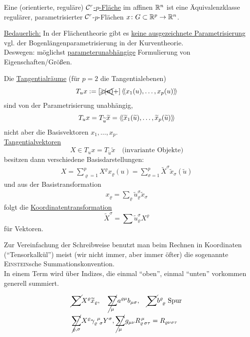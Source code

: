 \begin{definition}
Eine (orientierte, reguläre) \uline{\(\mathcal{C}^r\)-\(p\)-Fläche} im affinen \( \mathbb{R}^n\) ist eine Äquivalenzklasse regulärer, parametrisierter \(\mathcal{C}^r\)-\(p\)-Flächen \(x \colon G \subset \mathbb{R}^p \rightarrow \mathbb{R}^n\).
\end{definition}

\uline{Bedauerlich:}
In der Flächentheorie gibt es \uline{keine ausgezeichnete Parametrisierung} vgl. der Bogenlängenparametrisierung in der Kurventheorie. \\
Deswegen: möglichst \uline{parameterunabhängige} Formulierung von Eigenschaften/Größen. 

\begin{bsp}
 Die \uline{Tangentialräume} (für \(p = 2\) die Tangentialebenen)
 \[
  T_u x := \left[\xcancel{x(u)} + \right] \left\langle\!\left\langle x_1(u) , \dots, x_p(u) \right\rangle\!\right\rangle
 \]
 sind von der Parametrisierung unabhängig,
 \[
  T_u x = T_{\widetilde u}\widetilde x = \left\langle\!\left\langle \widetilde x_1( \widetilde u) , \dots, \widetilde x_p ( \widetilde u) \right\rangle\!\right\rangle
 \]
 nicht aber die Basisvektoren \(x_1, \dots, x_p\). \\
 \uline{Tangentialvektoren}
 \[
  X \in T_u x = T_{\widetilde u} \widetilde x \quad \text{(invariante Objekte)}
 \]
 besitzen dann verschiedene Basisdarstellungen:
 \begin{align*}
  X = \sum_{\varrho = 1}^p X^\varrho x_\varrho (u) = \sum_{\sigma = 1}^p \widetilde X^\sigma \widetilde x_\sigma ( \widetilde u)
 \end{align*}
 und aus der Basistransformation
 \begin{align*}
  x_\varrho = \sum_\varrho \widetilde u_\varrho^\sigma \widetilde x_\sigma
 \end{align*}
 folgt die \uline{Koordinatentransformation}
 \[
  \widetilde X^\sigma = \sum \widetilde u_\varrho^\sigma X^\varrho
 \]
 für Vektoren.
\end{bsp}

\begin{bemerkung}
 Zur Vereinfachung der Schreibweise benutzt man beim Rechnen in Koordinaten ("`Tensorkalkül"') meist (wir nicht immer, aber immer öfter) die sogenannte \textsc{Einstein}sche Summationskonvention. \\
 In einem Term wird über Indizes, die einmal "`oben"', einmal "`unten"' vorkommen generell summiert.
 \begin{bsp}
  \begin{align*}
  &\cancel{\sum} X^\varrho \widetilde x_\varrho, \quad \cancel{\sum_\mu} a^{\varrho \mu} b_{\mu \sigma}, \quad \cancel{\sum} b^{\varrho}_{\;\, \varrho} \text{ Spur} \\
  & \cancel{\sum_{\varrho, \sigma}} X^\varrho \gamma_{\varrho\;\,\sigma}^{\;\,\mu} Y^\sigma, \cancel{\sum_\mu} g_{\mu \nu} R_{\varrho \, \sigma \tau}^{\,\mu} = R_{\varrho \nu \sigma \tau}
  \end{align*}
 \end{bsp}
\end{bemerkung}

